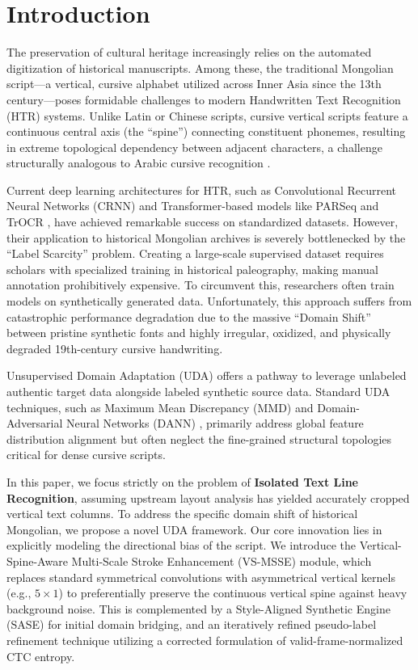 \documentclass[pdflatex,sn-mathphys-num]{sn-jnl}
\begin{document}
\section{Introduction}

The preservation of cultural heritage increasingly relies on the automated digitization of historical manuscripts. Among these, the traditional Mongolian script---a vertical, cursive alphabet utilized across Inner Asia since the 13th century---poses formidable challenges to modern Handwritten Text Recognition (HTR) systems. Unlike Latin or Chinese scripts, cursive vertical scripts feature a continuous central axis (the ``spine'') connecting constituent phonemes, resulting in extreme topological dependency between adjacent characters, a challenge structurally analogous to Arabic cursive recognition \cite{parvez2013arabic}. 

Current deep learning architectures for HTR, such as Convolutional Recurrent Neural Networks (CRNN) \cite{shi2016end} and Transformer-based models like PARSeq \cite{bautista2022parseq} and TrOCR \cite{li2021trocr}, have achieved remarkable success on standardized datasets. However, their application to historical Mongolian archives is severely bottlenecked by the ``Label Scarcity'' problem. Creating a large-scale supervised dataset requires scholars with specialized training in historical paleography, making manual annotation prohibitively expensive. To circumvent this, researchers often train models on synthetically generated data. Unfortunately, this approach suffers from catastrophic performance degradation due to the massive ``Domain Shift'' between pristine synthetic fonts and highly irregular, oxidized, and physically degraded 19th-century cursive handwriting.

Unsupervised Domain Adaptation (UDA) offers a pathway to leverage unlabeled authentic target data alongside labeled synthetic source data. Standard UDA techniques, such as Maximum Mean Discrepancy (MMD) \cite{tzeng2014deep} and Domain-Adversarial Neural Networks (DANN) \cite{ganin2015unsupervised}, primarily address global feature distribution alignment but often neglect the fine-grained structural topologies critical for dense cursive scripts.

In this paper, we focus strictly on the problem of \textbf{Isolated Text Line Recognition}, assuming upstream layout analysis has yielded accurately cropped vertical text columns. To address the specific domain shift of historical Mongolian, we propose a novel UDA framework. Our core innovation lies in explicitly modeling the directional bias of the script. We introduce the Vertical-Spine-Aware Multi-Scale Stroke Enhancement (VS-MSSE) module, which replaces standard symmetrical convolutions with asymmetrical vertical kernels (e.g., $5\times1$) to preferentially preserve the continuous vertical spine against heavy background noise. This is complemented by a Style-Aligned Synthetic Engine (SASE) for initial domain bridging, and an iteratively refined pseudo-label refinement technique utilizing a corrected formulation of valid-frame-normalized CTC entropy.
\end{document}
